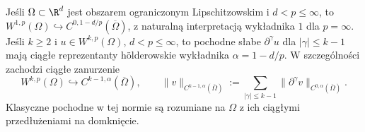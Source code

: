 \begin{wniosek}
\label{cor:pde10-Morrey-domain}
Jeśli $\Omega\subset\R^d$ jest obszarem ograniczonym Lipschitzowskim i $d<p\le\infty$, to
$W^{1,p}(\Omega)\hookrightarrow C^{0,1-d/p}(\overline\Omega)$,
z naturalną interpretacją wykładnika $1$ dla $p=\infty$.
Jeśli $k\ge2$ i $u\in W^{k,p}(\Omega)$, $d<p\le\infty$,
to pochodne słabe $\partial^\gamma u$ dla $|\gamma|\le k-1$
mają ciągłe reprezentanty hölderowskie wykładnika
$\alpha=1-d/p$. W szczególności zachodzi ciągłe zanurzenie
\[
 W^{k,p}(\Omega)\hookrightarrow C^{k-1,\alpha}(\overline\Omega),
 \qquad
 \|v\|_{C^{k-1,\alpha}(\overline\Omega)}
 :=\sum_{|\gamma|\le k-1}
       \|\partial^\gamma v\|_{C^{0,\alpha}(\overline\Omega)}.
\]
Klasyczne pochodne w tej normie są rozumiane na $\Omega$
z ich ciągłymi przedłużeniami na domknięcie.
\end{wniosek}
